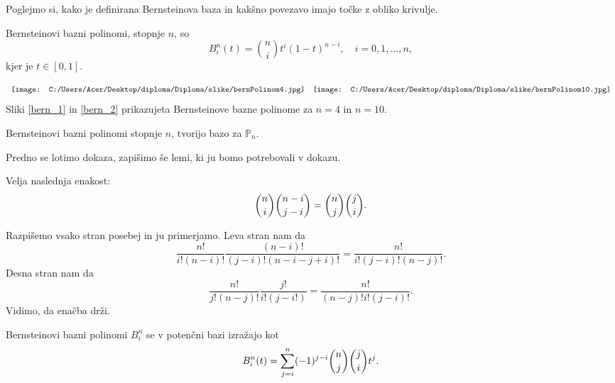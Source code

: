 \documentclass[mat1]{fmfdelo}
\begin{document}
Poglejmo si, kako je definirana Bernsteinova baza in kakšno povezavo imajo točke z obliko krivulje.
\begin{definicija}
Bernsteinovi bazni polinomi, stopnje $n$, so
\begin{equation*}
B_i^n(t) = \binom{n}{i} t^i (1-t)^{n-i}, \quad i=0,1,\dots,n,
\end{equation*}
kjer je $t\in\left[0,1\right]$.
\end{definicija}
\begin{equation*}
\begin{array}{c c}
\texttt{[image: C:/Users/Acer/Desktop/diploma/Diploma/slike/bernPolinom4.jpg]} &
\texttt{[image: C:/Users/Acer/Desktop/diploma/Diploma/slike/bernPolinom10.jpg]}
\end{array}
\end{equation*}
Sliki \ref{bern_1} in \ref{bern_2} prikazujeta Bernsteinove bazne polinome za $n = 4$ in $n= 10$.
\begin{trditev}
	Bernsteinovi bazni polinomi stopnje $n$, tvorijo bazo za $\mathbb{P}_n$.
\end{trditev}
Predno se lotimo dokaza, zapišimo še lemi, ki ju bomo potrebovali v dokazu.
\begin{lema}
	Velja naslednja enakost:
	\begin{equation}{\label{binom}}
		\binom{n}{i} \binom{n-i}{j-i} = \binom{n}{j} \binom{j}{i}.
	\end{equation}
\end{lema}
\begin{dokaz}
	Razpišemo vsako stran posebej in ju primerjamo. Leva stran nam da
	\begin{equation*}
		\frac{n!}{i!(n-i)!} \frac{(n-i)!}{(j-i)!(n-i-j+i)!} = \frac{n!}{i!(j-i)!(n-j)!}.
	\end{equation*}
	Desna stran nam da
	\begin{equation*}
		\frac{n!}{j!(n-j)!} \frac{j!}{i!(j-i!)} = \frac{n!}{(n-j)!i!(j-i)!}.
	\end{equation*}
	Vidimo, da enačba drži.
\end{dokaz}
\begin{lema}{\label{bern_potencna}}
	Bernsteinovi bazni polinomi $B_i^n$ se v potenčni bazi izražajo kot
	\begin{equation}{\label{bern_pot}}
		B_i^n(t) = \sum_{j=i}^n (-1)^{j-i} \binom{n}{j} \binom{j}{i} t^j.
	\end{equation}
\end{lema}
\end{document}
